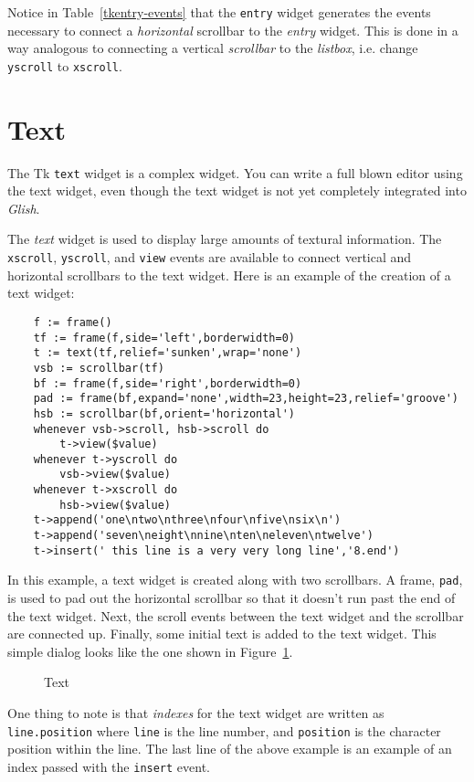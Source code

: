 Notice in Table~\ref{tkentry-events} that the {\tt entry} widget generates
the events necessary to connect a {\em horizontal} scrollbar to the {\em entry} widget.
This is done in a way analogous to connecting a vertical {\em scrollbar} to the
{\em listbox}, i.e. change {\tt yscroll} to {\tt xscroll}.
\FloatBarrier

\section{Text}
The Tk {\tt text} widget is a complex widget. You can
 write a full blown editor using the text widget, even though the
text widget is not yet completely integrated into {\em Glish}.

The {\em text} widget is used to display large amounts of textural information.
The {\tt xscroll}, {\tt yscroll}, and {\tt view} events are available to connect
vertical and horizontal scrollbars to the text widget. Here is an example of
the creation of a text widget:
\begin{verbatim}
    f := frame()
    tf := frame(f,side='left',borderwidth=0)
    t := text(tf,relief='sunken',wrap='none')
    vsb := scrollbar(tf)
    bf := frame(f,side='right',borderwidth=0)
    pad := frame(bf,expand='none',width=23,height=23,relief='groove')
    hsb := scrollbar(bf,orient='horizontal')
    whenever vsb->scroll, hsb->scroll do
        t->view($value)
    whenever t->yscroll do
        vsb->view($value)
    whenever t->xscroll do
        hsb->view($value)
    t->append('one\ntwo\nthree\nfour\nfive\nsix\n')
    t->append('seven\neight\nnine\nten\neleven\ntwelve')
    t->insert(' this line is a very very long line','8.end')
\end{verbatim}
In this example, a text widget is created along with two scrollbars. A frame,
{\tt pad}, is used to pad out the horizontal scrollbar so that it doesn't
run past the end of the text widget. Next, the scroll events between the text
widget and the scrollbar are connected up. Finally, some initial text is
added to the text widget. This simple dialog looks like the one shown
in Figure~\ref{tktext}.
\begin{figure}[thb]
\centerline{}
\caption{ Text }
\label{tktext}
\end{figure}

One thing to note is that {\em indexes} for the text widget are written as
\verb+line.position+ where {\tt line} is the line number, and {\tt position}
is the character position within the line. The last line of the above example
 is an example of an index passed with the {\tt insert} event.

